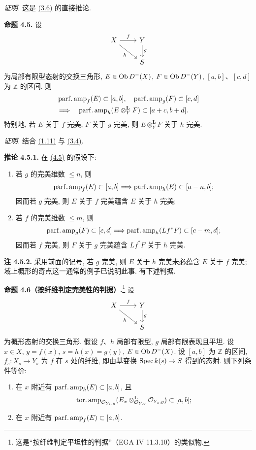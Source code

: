 \emph{证明.} 这是 \hyperlink{sga6.e03.prop.3-6}{(3.6)} 的直接推论.

\textbf{命题 4.5.} 设
\[
\begin{tikzcd}
X \arrow[r,"f"] \arrow[dr,"h"'] & Y \arrow[d,"g"]\\
& S
\end{tikzcd}
\]
为局部有限型态射的交换三角形, \(E\in\operatorname{Ob} D^{-}(X)\), \(F\in\operatorname{Ob} D^{-}(Y)\), \([a,b]\)、\([c,d]\) 为 \(\mathbb Z\) 的区间. 则
\[
\begin{aligned}
 &\operatorname{parf.amp}_f(E)\subset[a,b],\quad
 \operatorname{parf.amp}_g(F)\subset[c,d]\\
 &\Longrightarrow\quad
 \operatorname{parf.amp}_h(E\otimes_Y^{\mathbf L}F)
     \subset[a+c,b+d].
\end{aligned}
\]
特别地, 若 \(E\) 关于 \(f\) 完美, \(F\) 关于 \(g\) 完美, 则 \(E\otimes_Y^{\mathbf L}F\) 关于 \(h\) 完美.

\emph{证明.} 结合 \hyperlink{sga6.e03.prop.1-11}{(1.11)} 与 \hyperlink{sga6.e03.cor.3-4}{(3.4)}.

\textbf{推论 4.5.1.} 在 \hyperlink{sga6.e03.prop.4-5}{(4.5)} 的假设下:
\begin{enumerate}[label=\alph*)]
\item 若 \(g\) 的完美维数 \(\leq n\), 则
\[
 \operatorname{parf.amp}_f(E)
  \subset[a,b]
 \Longrightarrow
 \operatorname{parf.amp}_h(E)
  \subset[a-n,b];
\]
因而若 \(g\) 完美, 则 \(E\) 关于 \(f\) 完美蕴含 \(E\) 关于 \(h\) 完美;
\item 若 \(f\) 的完美维数 \(\leq m\), 则
\[
 \operatorname{parf.amp}_g(F)
  \subset[c,d]
 \Longrightarrow
 \operatorname{parf.amp}_h(Lf^*F)
  \subset[c-m,d];
\]
因而若 \(f\) 完美, 则 \(F\) 关于 \(g\) 完美蕴含 \(Lf^*F\) 关于 \(h\) 完美.
\end{enumerate}

\textbf{注 4.5.2.} 采用前面的记号, 若 \(g\) 完美, 则 \(E\) 关于 \(h\) 完美未必蕴含 \(E\) 关于 \(f\) 完美; 域上概形的奇点这一通常的例子已说明此事. 有下述判据.

\textbf{命题 4.6（按纤维判定完美性的判据）.}\footnote{这是“按纤维判定平坦性的判据”（EGA IV 11.3.10）的类似物.} 设
\[
\begin{tikzcd}
X \arrow[r,"f"] \arrow[dr,"h"'] & Y \arrow[d,"g"]\\
& S
\end{tikzcd}
\]
为概形态射的交换三角形. 假设 \(f\)、\(h\) 局部有限型, \(g\) 局部有限表现且平坦. 设 \(x\in X\), \(y=f(x)\), \(s=h(x)=g(y)\), \(E\in\operatorname{Ob} D^{-}(X)\). 设 \([a,b]\) 为 \(\mathbb Z\) 的区间, \(f_s:X_s\to Y_s\) 为 \(f\) 在 \(s\) 处的纤维, 即由基变换 \(\operatorname{Spec} k(s)\to S\) 得到的态射. 则下列条件等价:
\begin{enumerate}[label=\roman*)]
\item 在 \(x\) 附近有 \(\operatorname{parf.amp}_h(E)\subset[a,b]\), 且
\[
 \operatorname{tor.amp}_{\mathcal O_{Y_s,y}}(E_x\otimes_{\mathcal O_{Y,y}}^{\mathbf L}\mathcal O_{Y_s,y})
 \subset[a,b];
\]
\item 在 \(x\) 附近有 \(\operatorname{parf.amp}_f(E)\subset[a,b]\).
\end{enumerate}

